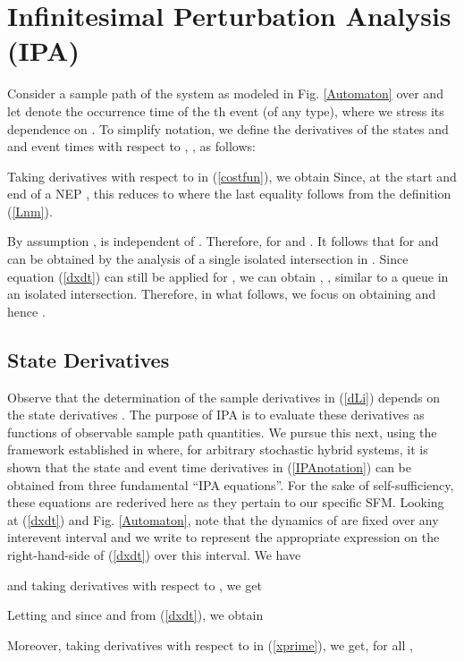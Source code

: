 \documentclass{ifacconf}\usepackage{graphicx}
\begin{document}
\section{Infinitesimal Perturbation Analysis (IPA)}

Consider a sample path of the system as modeled in Fig. \ref{Automaton} over
 and let  denote the occurrence time of the th
event (of any type), where we stress its dependence on . To simplify
notation, we define the derivatives of the states  and
 and event times  with respect to
, , as follows:

Taking derivatives with respect to  in (\ref{costfun}), we obtain
Since, at the start and end of a NEP ,
this reduces to
where the last equality follows from the definition (\ref{Lnm}).

By assumption ,  is independent of . Therefore,
 for  and . It follows that
 for  and  can be obtained by the analysis
of a single isolated intersection in \cite{GengCDC12}. Since equation
(\ref{dxdt}) can still be applied for , we can obtain , , similar to a queue in an isolated intersection.
Therefore, in what follows, we focus on obtaining  and
hence .

\subsection{State Derivatives}

Observe that the determination of the sample derivatives in (\ref{dLi})
depends on the state derivatives . The purpose of IPA is
to evaluate these derivatives as functions of observable sample path
quantities. We pursue this next, using the framework established in
\cite{Cassandras10} where, for arbitrary stochastic hybrid systems, it is
shown that the state and event time derivatives in (\ref{IPAnotation}) can be
obtained from three fundamental \textquotedblleft IPA
equations\textquotedblright. For the sake of self-sufficiency, these equations
are rederived here as they pertain to our specific SFM. Looking at
(\ref{dxdt}) and Fig. \ref{Automaton}, note that the dynamics of 
are fixed over any interevent interval  and we write
 to represent the appropriate expression on the
right-hand-side of (\ref{dxdt}) over this interval. We have

and taking derivatives with respect to , we get

Letting  and since  and  from (\ref{dxdt}), we
obtain

Moreover, taking derivatives with respect to  in (\ref{xprime}), we get,
for all ,
\end{document}
